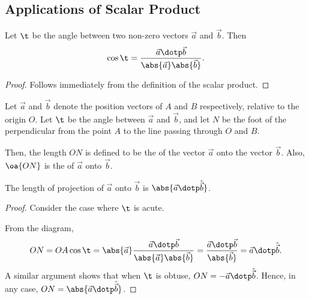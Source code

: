 \subsection{Applications of Scalar Product}

\begin{proposition}
    Let $\t$ be the angle between two non-zero vectors $\vec a$ and $\vec b$. Then \[\cos \t = \frac{\vec a \dotp \vec b}{\abs{\vec a} \abs{\vec b}}.\]
\end{proposition}
\begin{proof}
    Follows immediately from the definition of the scalar product.
\end{proof}

\begin{definition}
    Let $\vec a$ and $\vec b$ denote the position vectors of $A$ and $B$ respectively, relative to the origin $O$. Let $\t$ be the angle between $\vec a$ and $\vec b$, and let $N$ be the foot of the perpendicular from the point $A$ to the line passing through $O$ and $B$.

    Then, the length $ON$ is defined to be the  of the vector $\vec a$ onto the vector $\vec b$. Also, $\oa{ON}$ is the  of $\vec a$ onto $\vec b$.
\end{definition}

\begin{proposition}
    The length of projection of $\vec a$ onto $\vec b$ is $\abs{\vec a \dotp \hat{\vec b}}$.
\end{proposition}
\begin{proof}
    Consider the case where $\t$ is acute.

    \begin{figure}[H]
        \centering
        \caption{\label{fig:336}}
    \end{figure}

    From the diagram, \[ON = OA \cos \t = \abs{\vec a} \frac{\vec a \dotp \vec b}{\abs{\vec a} \abs{\vec b}} = \frac{\vec a \dotp \vec b}{\abs{\vec b}} = \vec a \dotp \hat{\vec b}.\] A similar argument shows that when $\t$ is obtuse, $ON = -\vec a \dotp \hat{\vec b}$. Hence, in any case, $ON = \abs{\vec a \dotp \hat{\vec b}}$.
\end{proof}

